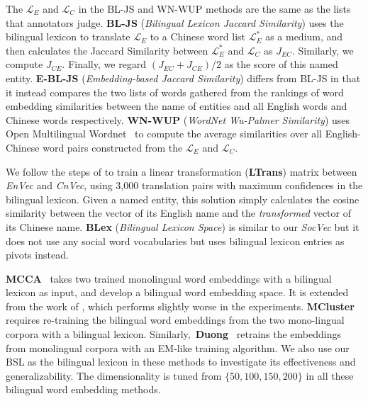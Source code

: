 The $\mathcal{L}_E$  and $\mathcal{L}_C$ in the BL-JS and WN-WUP methods are the same as the lists that annotators judge.
\textbf{BL-JS} (\textit{Bilingual Lexicon Jaccard Similarity}) uses the bilingual lexicon to translate $\mathcal{L}_E$  to a Chinese word list 
$\mathcal{L}_E^*$ as a medium, and then calculates the Jaccard Similarity between 
$\mathcal{L}_E^*$ and $\mathcal{L}_C$ as $J_{EC}$. Similarly, we compute $J_{CE}$. 
Finally, we regard $(J_{EC}+J_{CE})/{2}$ as the score 
of this named entity.
\textbf{E-BL-JS} (\textit {Embedding-based Jaccard Similarity}) differs from BL-JS in that it instead compares the two lists of words gathered from the
rankings of word embedding similarities between the name of entities and all English words 
and Chinese words respectively. 
\textbf{WN-WUP} (\textit{WordNet Wu-Palmer Similarity}) uses Open Multilingual 
Wordnet~\cite{wang2013building} to compute the average 
similarities over all English-Chinese word pairs constructed from the $\mathcal{L}_E$ and $\mathcal{L}_C$.
 
We follow the steps of \citet{Mikolov:2013tp} 
to train a linear transformation (\textbf{LTrans}) matrix between \textit{EnVec} and \textit{CnVec}, 
using 3,000 translation pairs with maximum confidences in the bilingual lexicon. 
Given a named entity, this solution simply calculates the cosine similarity
between the vector of its English name and the \textit{transformed} vector 
of its Chinese name. 
\textbf{BLex} (\textit {Bilingual Lexicon Space}) is  similar to our \textit{SocVec} but it does not 
use any social word vocabularies but uses bilingual lexicon entries as pivots instead.
 
\textbf{MCCA}~\cite{ammar2016massively} takes two trained monolingual word 
embeddings with a bilingual lexicon as input, and develop a bilingual word 
embedding space. It is extended from the work of \citet{DBLP:conf/eacl/FaruquiD14}, which performs slightly worse in the experiments.
\textbf{MCluster} \cite{ammar2016massively} requires re-training the bilingual word embeddings from the two mono-lingual corpora with a bilingual lexicon.
Similarly,~\textbf{Duong}~\cite{duong2016learning} retrains the embeddings from monolingual corpora with an EM-like training algorithm. 
We also use our BSL as the bilingual lexicon in these methods to investigate its effectiveness and generalizability. 
The dimensionality is tuned from $\{50,100,150,200\}$ in all these bilingual word embedding methods.

